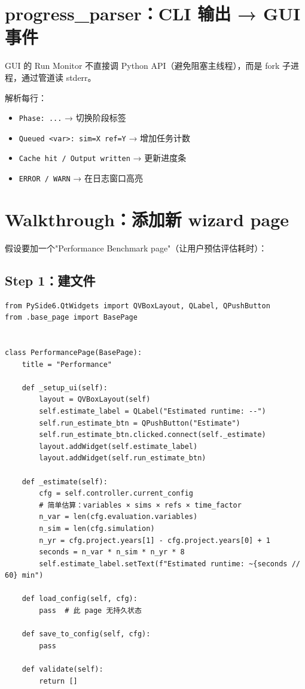\section{progress\_parser：CLI 输出 → GUI 事件}

\openbench{} GUI 的 Run Monitor 不直接调 Python API（避免阻塞主线程），而是 fork  子进程，通过管道读 stderr。

 解析每行：

\begin{itemize}
  \item \texttt{Phase: ...} → 切换阶段标签
  \item \texttt{Queued <var>: sim=X ref=Y} → 增加任务计数
  \item \texttt{Cache hit / Output written} → 更新进度条
  \item \texttt{ERROR / WARN} → 在日志窗口高亮
\end{itemize}


\section{Walkthrough：添加新 wizard page}

假设要加一个"Performance Benchmark page"（让用户预估评估耗时）：

\subsection{Step 1：建文件 }

\begin{verbatim}
from PySide6.QtWidgets import QVBoxLayout, QLabel, QPushButton
from .base_page import BasePage


class PerformancePage(BasePage):
    title = "Performance"

    def _setup_ui(self):
        layout = QVBoxLayout(self)
        self.estimate_label = QLabel("Estimated runtime: --")
        self.run_estimate_btn = QPushButton("Estimate")
        self.run_estimate_btn.clicked.connect(self._estimate)
        layout.addWidget(self.estimate_label)
        layout.addWidget(self.run_estimate_btn)

    def _estimate(self):
        cfg = self.controller.current_config
        # 简单估算：variables × sims × refs × time_factor
        n_var = len(cfg.evaluation.variables)
        n_sim = len(cfg.simulation)
        n_yr = cfg.project.years[1] - cfg.project.years[0] + 1
        seconds = n_var * n_sim * n_yr * 8
        self.estimate_label.setText(f"Estimated runtime: ~{seconds // 60} min")

    def load_config(self, cfg):
        pass  # 此 page 无持久状态

    def save_to_config(self, cfg):
        pass

    def validate(self):
        return []
\end{verbatim}

